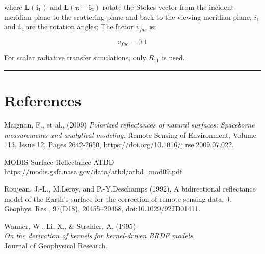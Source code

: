 \documentclass[
  11pt,
  letterpaper,
  DIV=11,
  numbers=noendperiod]{scrreprt}
\begin{document}
where \(\mathbf{L(i_1)}\) and \(\mathbf{L(\pi-i_2)}\) rotate the Stokes
vector from the incident meridian plane to the scattering plane and back
to the viewing meridian plane; \(i_1\) and \(i_2\) are the rotation
angles; The factor \(v_{fac}\) is:

\[
v_{fac} = 0.1
\]

For scalar radiative transfer simulations, only \(R_{11}\) is used.

\begin{center}\rule{0.5\linewidth}{0.5pt}\end{center}

\section{References}\label{references}

Maignan, F., et al., (2009) \emph{Polarized reflectances of natural
surfaces: Spaceborne measurements and analytical modeling.} Remote
Sensing of Environment, Volume 113, Issue 12, Pages 2642-2650,
https://doi.org/10.1016/j.rse.2009.07.022.

MODIS Surface Reflectance ATBD\\
https://modis.gsfc.nasa.gov/data/atbd/atbd\_mod09.pdf

Roujean, J.-L., M.Leroy, and P.-Y.Deschamps (1992), A bidirectional
reflectance model of the Earth's surface for the correction of remote
sensing data, J. Geophys. Res., 97(D18), 20455--20468,
doi:10.1029/92JD01411.

Wanner, W., Li, X., \& Strahler, A. (1995)\\
\emph{On the derivation of kernels for kernel-driven BRDF models.}\\
Journal of Geophysical Research.
\end{document}
